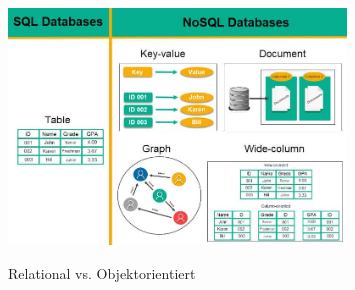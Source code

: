 \cite{database_relational}
\newline
\begin{figure}[h!]
  \centering
  \includegraphics[width=0.8\textwidth]{pics/database-types.jpg}
  \caption{Relational vs. Objektorientiert}
  \cite{database_types}
\end{figure}